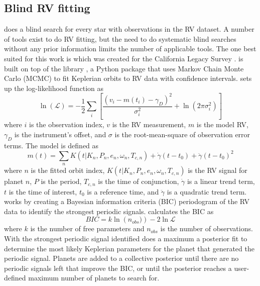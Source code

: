 \subsection{Blind RV fitting}

 does a blind search for every star with observations in the
RV dataset. A number of tools exist to do RV fitting, but the need to do systematic blind
searches without any prior information limits the number of applicable tools. The one
best suited for this work is  which was created for the
California Legacy Survey \citep{rosenthalCaliforniaLegacy2021}. 
is built on top of the 
library \citep{fultonRadvelRadialVelocity2018}, a Python package that uses
Markov Chain Monte Carlo (MCMC) to fit Keplerian orbits to RV data
with confidence intervals.  sets up the log-likelihood function
as \citep{rosenthalCaliforniaLegacy2021} 
\begin{equation}
\ln(\mathcal{L}) = -\frac{1}{2}
\sum_i \left[ \frac{\left(v_i - m(t_i) - \gamma_D\right)^2}{\sigma_i^2} +
\ln\left(2 \pi \sigma_i^2\right)\right]
  \label{eq:likelihoodfun}
\end{equation}
where $i$ is the observation index,
$v$ is the RV measurement, $m$ is the model RV, $\gamma_D$ is the instrument's
offset, and $\sigma$ is the root-mean-square of observation error terms. The
model is defined as 
\begin{equation}
m(t) = \sum_n K(t|K_n,P_n,e_n,\omega_n,T_{c,n}) +
\dot{\gamma}(t-t_0) + \ddot{\gamma}(t-t_0)^2
  \label{eq:rv_model}
\end{equation}
where $n$ is the fitted orbit
index, $K(t|K_n,P_n,e_n,\omega_n,T_{c,n})$ is the RV signal for planet $n$, $P$
is the period, $T_{c,n}$ is the time of conjunction, $\dot{\gamma}$ is a linear
trend term, $t$ is the time of interest, $t_0$ is a reference time, and
$\ddot{\gamma}$ is a quadratic trend term.  works by creating a
Bayesian information criteria (BIC) periodogram of the RV data to identify
the strongest periodic signals.  calculates the BIC as 
\begin{equation}
BIC = k
\ln\left(n_{obs})\right) - 2\ln{\mathcal{L}}
  \label{eq:bic}
\end{equation}
where $k$ is the number of free parameters and $n_{obs}$ is the number of
observations. With the strongest periodic signal identified 
does a maximum a posterior fit to determine the most likely Keplerian
parameters for the planet that generated the periodic signal. Planets are added
to a collective posterior until there are no periodic signals left that improve
the BIC, or until the  posterior reaches a user-defined maximum
number of planets to search for.

